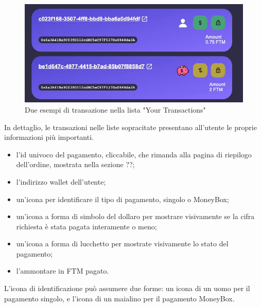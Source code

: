                 \begin{figure}[H]
                    \centering
                    \includegraphics[scale=0.4]{immagini/transactionsmall.jpg}
                    \caption{Due esempi di transazione nella lista "Your Transactions"}
                \end{figure}

                In dettaglio, le transazioni nelle liste sopracitate presentano all'utente le proprie informazioni più importanti.

                \begin{itemize}
                    \item l'id univoco del pagamento, cliccabile, che rimanda alla pagina di riepilogo dell'ordine, mostrata nella sezione ??;
                    \item l'indirizzo wallet dell'utente;
                    \item un'icona per identificare il tipo di pagamento, singolo o MoneyBox;
                    \item un'icona a forma di simbolo del dollaro per mostrare visivamente se la cifra richiesta è stata pagata interamente o meno;
                    \item un'icona a forma di lucchetto per mostrate visivamente lo stato del pagamento;
                    \item l'ammontare in FTM pagato.
                \end{itemize}

                L'icona di identificazione può assumere due forme: un icona di un uomo per il pagamento singolo, e l'icona di un maialino per il pagamento MoneyBox.

